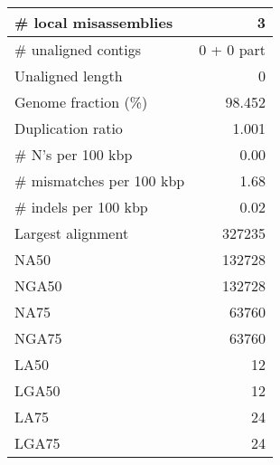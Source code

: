 \documentclass[12pt,a4paper]{article}
\begin{document}
\begin{table}[ht]
\begin{center}
\begin{tabular}{|l*{1}{|r}|}
\# local misassemblies & 3 \\ \hline
\# unaligned contigs & 0 + 0 part \\ \hline
Unaligned length & 0 \\ \hline
Genome fraction (\%) & 98.452 \\ \hline
Duplication ratio & 1.001 \\ \hline
\# N's per 100 kbp & 0.00 \\ \hline
\# mismatches per 100 kbp & 1.68 \\ \hline
\# indels per 100 kbp & 0.02 \\ \hline
Largest alignment & 327235 \\ \hline
NA50 & 132728 \\ \hline
NGA50 & 132728 \\ \hline
NA75 & 63760 \\ \hline
NGA75 & 63760 \\ \hline
LA50 & 12 \\ \hline
LGA50 & 12 \\ \hline
LA75 & 24 \\ \hline
LGA75 & 24 \\ \hline
\end{tabular}
\end{center}
\end{table}
\end{document}
